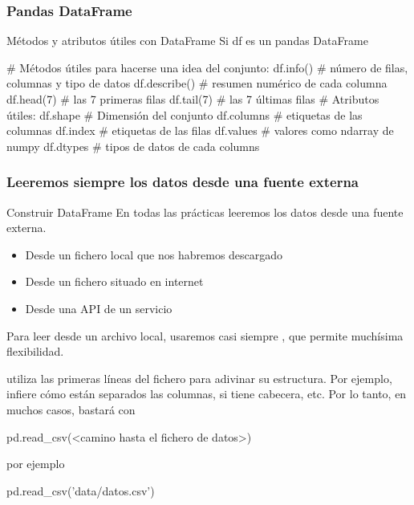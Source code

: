 \documentclass[9pt]{beamer}
\begin{document}
\begin{frame}[fragile]
  \frametitle{Pandas DataFrame}
  \begin{block}{Métodos y atributos útiles con DataFrame}
    Si df es un pandas DataFrame
  \begin{pyverbatim}
# Métodos útiles para hacerse una idea del conjunto:
df.info()              # número de filas, columnas y tipo de datos
df.describe()          # resumen numérico de cada columna
df.head(7)             # las 7 primeras filas
df.tail(7)             # las 7 últimas filas
# Atributos útiles:
df.shape               # Dimensión del conjunto
df.columns             # etiquetas de las columnas
df.index               # etiquetas de las filas
df.values              # valores como ndarray de numpy
df.dtypes              # tipos de datos de cada columns
  \end{pyverbatim}
  \end{block}
\end{frame}
\begin{frame}[fragile]
  \frametitle{Leeremos siempre los datos desde una fuente externa}
  \begin{block}{Construir DataFrame}
    En todas las prácticas leeremos los datos desde una fuente externa.
    \begin{itemize}
    \item Desde un fichero local que nos habremos descargado 
    \item Desde un fichero situado en internet
    \item Desde una API de un servicio
    \end{itemize}
  \end{block}
  \pause
Para leer desde un archivo local, usaremos casi siempre , que permite muchísima flexibilidad.\pause
\begin{block}{}
   utiliza las primeras líneas del fichero para adivinar su estructura. Por ejemplo, infiere cómo están separados las columnas, si tiene cabecera, etc. Por lo tanto, en muchos casos, bastará con
  \begin{pyverbatim}
    pd.read_csv(<camino hasta el fichero de datos>)
  \end{pyverbatim}
  por ejemplo
  \begin{center}
  \begin{pyverbatim}
    pd.read_csv('data/datos.csv')
  \end{pyverbatim}
  \end{center}
\end{block}
 \end{frame}
\end{document}
